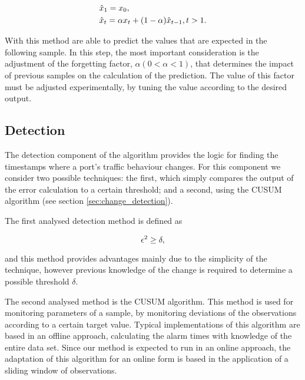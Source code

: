 \begin{equation}
    \centering
        \begin {split}
            &\hat{x}_1 = x_0, \\
            &\hat{x}_t = \alpha x_{t} + (1-\alpha)\hat{x}_{t-1}, t > 1.
        \end {split}
    \label{eq:exp_smooth_rep}
\end{equation}

\par With this method are able to predict the values that are expected in the following sample. In this step, the most important consideration is the adjustment of 
the forgetting factor, $\alpha (0 < \alpha < 1)$, that determines the impact of previous samples on the calculation of the prediction. The value of this factor must
be adjusted experimentally, by tuning the value according to the desired output.

\subsection{Detection}

The detection component of the algorithm provides the logic for finding the timestamps where a port's traffic behaviour changes. For this component we consider two
possible techniques: the first, which simply compares the output of the error calculation to a certain threshold; and a second, using the CUSUM algorithm (see 
section \ref{sec:change_detection}).

\par The first analysed detection method is defined as

\begin{equation*}
    \centering
    \label{eq:detection_method}
    \epsilon^2 \geq \delta,
\end{equation*}

\par and this method provides advantages mainly due to the simplicity of the technique, however previous knowledge of the change is required to determine a
possible threshold $\delta$.

\par The second analysed method is the CUSUM algorithm. This method is used for monitoring parameters of a sample, by monitoring deviations of the observations
according to a certain target value. Typical implementations of this algorithm are based in an offline approach, calculating the alarm times with knowledge of the 
entire data set. Since our method is expected to run in an online approach, the adaptation of this algorithm for an online form is based in the application of a 
sliding window of observations.

